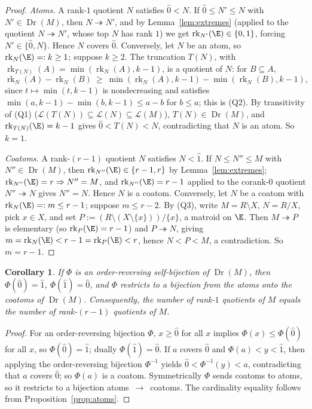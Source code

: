 \documentclass[11pt]{article}
\newcommand{\Dr}{\operatorname{Dr}}
\newcommand{\cL}{\mathcal{L}}
\newcommand{\rk}{\operatorname{rk}}
\newtheorem{corollary}{Corollary}
\theoremstyle{definition}
\theoremstyle{remark}
\begin{document}
\begin{proof}
\emph{Atoms.} A rank-$1$ quotient $N$ satisfies $\hat 0<N$. If $\hat 0\le N'\le N$
with $N'\in\Dr(M)$, then $N\twoheadrightarrow N'$, and by Lemma~\ref{lem:extremes}
(applied to the quotient $N\twoheadrightarrow N'$, whose top $N$ has rank $1$) we get
$\rk_{N'}(\E)\in\{0,1\}$, forcing $N'\in\{\hat 0,N\}$. Hence $N$ covers $\hat 0$.
Conversely, let $N$ be an atom, so $\rk_N(\E)=:k\ge 1$; suppose $k\ge 2$. The
truncation $T(N)$, with $\rk_{T(N)}(A)=\min(\rk_N(A),k-1)$, is a quotient of $N$:
for $B\subseteq A$,
\[
\rk_N(A)-\rk_N(B)\ \ge\ \min(\rk_N(A),k-1)-\min(\rk_N(B),k-1),
\]
since $t\mapsto\min(t,k-1)$ is nondecreasing and satisfies
$\min(a,k-1)-\min(b,k-1)\le a-b$ for $b\le a$; this is (Q2). By transitivity of (Q1)
($\cL(T(N))\subseteq\cL(N)\subseteq\cL(M)$), $T(N)\in\Dr(M)$, and
$\rk_{T(N)}(\E)=k-1$ gives $\hat 0<T(N)<N$, contradicting that $N$ is an atom. So
$k=1$.

\emph{Coatoms.} A rank-$(r-1)$ quotient $N$ satisfies $N<\hat 1$. If $N\le N''\le M$
with $N''\in\Dr(M)$, then $\rk_{N''}(\E)\in\{r-1,r\}$ by Lemma~\ref{lem:extremes};
$\rk_{N''}(\E)=r\Rightarrow N''=M$, and $\rk_{N''}(\E)=r-1$ applied to the corank-$0$
quotient $N''\twoheadrightarrow N$ gives $N''=N$. Hence $N$ is a coatom. Conversely,
let $N$ be a coatom with $\rk_N(\E)=:m\le r-1$; suppose $m\le r-2$. By (Q3), write
$M=R\setminus X$, $N=R/X$, pick $x\in X$, and set
$P:=(R\setminus(X\setminus\{x\}))/\{x\}$, a matroid on $\E$. Then
$M\twoheadrightarrow P$ is elementary (so $\rk_P(\E)=r-1$) and
$P\twoheadrightarrow N$, giving $m=\rk_N(\E)<r-1=\rk_P(\E)<r$, hence $N<P<M$, a
contradiction. So $m=r-1$.
\end{proof}

\begin{corollary}\label{cor:nec}
If $\Phi$ is an order-reversing self-bijection of $\Dr(M)$, then $\Phi(\hat 0)=\hat 1$,
$\Phi(\hat 1)=\hat 0$, and $\Phi$ restricts to a bijection from the atoms onto the
coatoms of $\Dr(M)$. Consequently, the number of rank-$1$ quotients of $M$ equals the
number of rank-$(r-1)$ quotients of $M$.
\end{corollary}

\begin{proof}
For an order-reversing bijection $\Phi$, $x\ge\hat 0$ for all $x$ implies
$\Phi(x)\le\Phi(\hat 0)$ for all $x$, so $\Phi(\hat 0)=\hat 1$; dually
$\Phi(\hat 1)=\hat 0$. If $a$ covers $\hat 0$ and $\Phi(a)<y<\hat 1$, then applying
the order-reversing bijection $\Phi^{-1}$ yields $\hat 0<\Phi^{-1}(y)<a$, contradicting
that $a$ covers $\hat 0$; so $\Phi(a)$ is a coatom. Symmetrically $\Phi$ sends coatoms
to atoms, so it restricts to a bijection atoms~$\to$~coatoms. The cardinality
equality follows from Proposition~\ref{prop:atoms}.
\end{proof}
\end{document}
